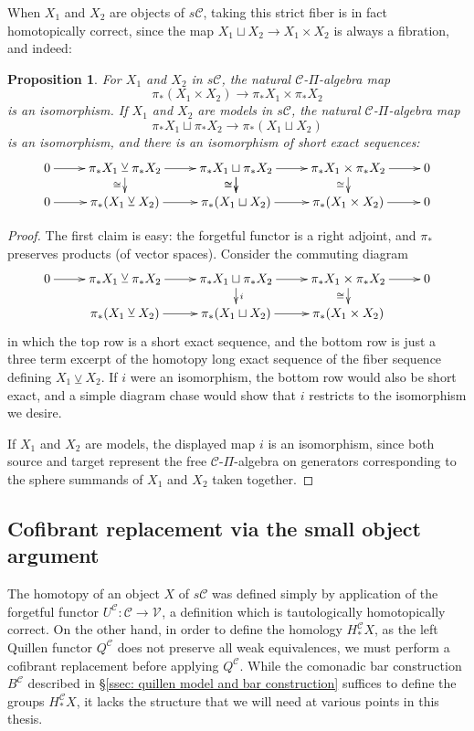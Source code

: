 \documentclass[11pt]{amsart} \renewcommand{\baselinestretch}{1.2}
\theoremstyle{plain}
\newtheorem{prop}[thm]{Proposition}
\numberwithin{equation}{section} %
\theoremstyle{plain}
\newtheorem{prop}[thm]{Proposition}
\numberwithin{equation}{chapter} %
\renewcommand{\to}{\longrightarrow}
\newcommand{\calV}{\mathcal{V}}
\newcommand{\calc}{\mathcal{C}}
\newcommand{\vect}[2]{\calV^{#1}_{#2}}
\newcommand{\smashcoprod}{\veebar}%
\newcommand{\SubsectionOrSection}[1]{\subsection{#1}}
\begin{document}
\begin{Pi-algebras and cohomology algebras}
When $X_1$ and $X_2$ are  objects of $s\calc$, taking this strict fiber is in fact homotopically correct, since the map $X_1\sqcup X_2\to X_1\times X_2$ is always a fibration, and indeed:
\begin{prop}
\label{smash coprod}
For $X_1$ and $X_2$ in $s\calc$, the natural $\calc$-$\Pi$-algebra map
\[\pi_*(X_1\times X_2)\to \pi_* X_1\times \pi_* X_2\]
 is an isomorphism. If $X_1$ and $X_2$ are models in $s\calc$, the natural $\calc$-$\Pi$-algebra map 
\[\pi_* X_1\sqcup \pi_* X_2\to\pi_*(X_1\sqcup X_2)\]
is an isomorphism, and there is an isomorphism of short exact sequences:
\[\xymatrix@R=4mm{
0\ar[r]&%
\pi_* X_1\smashcoprod \pi_* X_2
\ar[r]\ar[d]_-{\cong}
&%
\pi_* X_1\sqcup \pi_* X_2
\ar[r]
\ar[d]_-{\cong}\ar[d]_-{\cong}
&%
\pi_* X_1\times \pi_* X_2
\ar[r]
\ar[d]_-{\cong}
&%
0\\%
0\ar[r]&%
\pi_* (X_1\smashcoprod  X_2)
\ar[r]
&%
\pi_* (X_1\sqcup X_2)
\ar[r]
&%
\pi_* (X_1\times X_2)
\ar[r]&0
}\]
\end{prop}
\begin{proof}
The first claim is easy: the forgetful functor is a right adjoint, and $\pi_*$ preserves products (of vector spaces). Consider the commuting diagram
\[\xymatrix@R=4mm{
0\ar[r]&%
\pi_* X_1\smashcoprod \pi_* X_2
\ar[r]
&%
\pi_* X_1\sqcup \pi_* X_2
\ar[r]
\ar[d]^-{i}
&%
\pi_* X_1\times \pi_* X_2
\ar[r]
\ar[d]_-{\cong}
&%
0\\%
&%
\pi_* (X_1\smashcoprod  X_2)
\ar[r]
&%
\pi_* (X_1\sqcup X_2)
\ar[r]
&%
\pi_* (X_1\times X_2)
}\]
in which the top row is a short exact sequence, and the bottom row is just a three term excerpt of the homotopy long exact sequence of the fiber sequence defining $X_1\smashcoprod X_2$. If $i$ were an isomorphism, the bottom row would also be short exact, and a simple diagram chase would show that $i$ restricts to the isomorphism we desire.


If $X_1$ and $X_2$ are models, the displayed map $i$ is an isomorphism, since both source and target represent the free $\calc$-$\Pi$-algebra on generators corresponding to the sphere summands of $X_1$ and $X_2$ taken together. 
\end{proof}

\SubsectionOrSection{Cofibrant replacement via the small object argument}\label{Cofibrant replacement via the small object argument}
The homotopy of an object $X$ of $s\calc$ was defined simply by application of the forgetful functor $U^{\calc}:\calc\to\vect{}{}$, a definition which is tautologically homotopically correct. On the other hand, in order to define the homology $H_*^{\calc}X$, as the left Quillen functor $Q^{\calc}$ does not preserve all weak equivalences, we must perform a cofibrant replacement before applying $Q^{\calc}$. While the comonadic bar construction $B^{\calc}$ described in \S\ref{ssec: quillen model and bar construction} suffices to define the groups $H_*^{\calc}X$, it lacks the structure that we will need at various points in this thesis.


\end{Pi-algebras and cohomology algebras}
\end{document}

